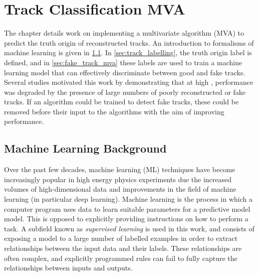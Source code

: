 \chapter{Track Classification MVA}\label{chap:track_classification_mva}

The chapter details work on implementing a multivariate algorithm (MVA) to predict the truth origin of reconstructed tracks.
An introduction to formalisms of machine learning is given in \cref{sec:ml_background}.
In \cref{sec:track_labelling}, the truth origin label is defined, and in \cref{sec:fake_track_mva} these labels are used to train a machine learning model that can effectively discriminate between good and fake tracks.
Several studies motivated this work by demonstrating that at high \pt, \btagging performance was degraded by the presence of large numbers of poorly reconstructed or fake tracks.
If an algorithm could be trained to detect fake tracks, these could be removed before their input to the \btagging algorithms with the aim of improving performance.


\section{Machine Learning Background}\label{sec:ml_background}

Over the past few decades, machine learning (ML) techniques have become increasingly popular in high energy physics experiments due the increased volumes of high-dimensional data and improvements in the field of machine learning (in particular deep learning).
Machine learning is the process in which a computer program uses data to learn suitable parameters for a predictive model model.
This is opposed to explicitly providing instructions on how to perform a task.
A subfield known as \textit{supervised learning} is used in this work, and consists of exposing a model to a large number of labelled examples in order to extract relationships between the input data and their labels.
These relationships are often complex, and explicitly programmed rules can fail to fully capture the relationships between inputs and outputs.


